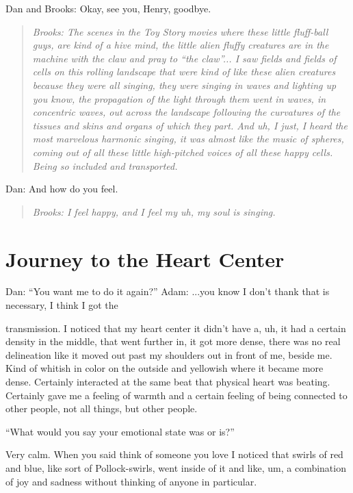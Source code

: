 \documentclass[12pt]{book}
\begin{document}
Dan and Brooks: Okay,  see you, Henry, goodbye.


\begin{quote}{\em
Brooks:  The scenes in the Toy Story movies where these
little fluff-ball guys, are kind of a hive mind,
the little alien fluffy creatures are in the machine
with the claw and pray to ``the claw''...
I saw fields and fields of cells on this rolling landscape
that were kind of like these alien creatures because they
were all singing, they were singing in waves and lighting up
you know, the propagation of the light through them went
in waves, in concentric waves, out across the landscape
following the curvatures of the tissues and skins and organs
of which they part. And uh, I just,  I heard the most marvelous harmonic
singing, it was almost like the music of spheres,
coming out of all these little high-pitched voices 
of all these happy cells.
Being so included and transported.
}\end{quote}

Dan: And how do you feel.

\begin{quote}{\em
Brooks: I feel happy, and I feel my uh, my soul is singing.
}\end{quote}    

\section{Journey to the Heart Center}

Dan: “You want me to do it again?”
Adam: ...you know I don’t thank that is necessary, I think I got the
					
transmission. I noticed that my heart center it didn't have a, uh, it had a certain density in the middle, that went further in, it got more dense, there was no real delineation like it moved out past my shoulders out in front of me, beside me. Kind of whitish in color on the outside and yellowish where it became more dense. Certainly interacted at the same beat that physical heart was beating. Certainly gave me a feeling of warmth and a certain feeling of being connected to other people, not all things, but other people.
					
“What would you say your emotional state was or is?”
					
Very calm. When you said think of someone you love I noticed that swirls of red and blue, like sort of Pollock-swirls, went inside of it and like, um, a combination of joy and sadness without thinking of anyone in particular.
					
\end{document}
